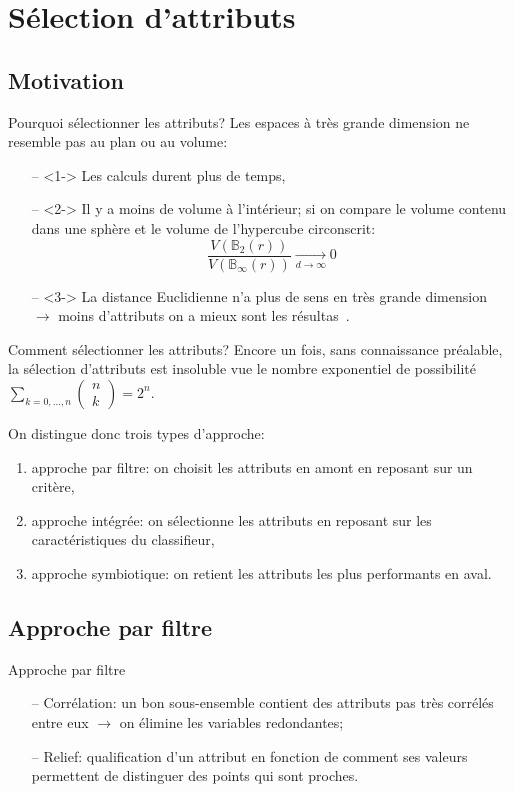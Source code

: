 \documentclass[9pt]{beamer}
\begin{document}
	\section[feature selection]{Sélection d'attributs}
	\subsection[motivation]{Motivation}
	\begin{frame}{Pourquoi sélectionner les attributs?}
		Les espaces à très grande dimension ne resemble pas au plan ou au volume:
		\begin{itemize}
			\item[--]<1-> Les calculs durent plus de temps,
			\item[--]<2-> Il y a moins de volume à l'intérieur; si on compare le volume contenu dans une sphère et le volume de l'hypercube circonscrit:
			$$\frac{V(\mathbb{B}_{2}(r))}{V(\mathbb{B}_{\infty}(r))}\xrightarrow[d \to \infty]{} 0$$
			\item[--]<3-> La distance Euclidienne n'a plus de sens en très grande dimension $\longrightarrow$ moins d'attributs on a mieux sont les résultas~\cite{Domingos:2012:FUT:2347736.2347755}.
		\end{itemize}
	\end{frame}

	\begin{frame}{Comment sélectionner les attributs?}
		Encore un fois, sans connaissance préalable, la sélection d'attributs est insoluble vue le nombre exponentiel de possibilité $\sum_{k=0,\dots,n} \begin{pmatrix}
		n\\
		k
		\end{pmatrix} = 2^n$.

		On distingue donc trois types d'approche:
		\begin{enumerate}
			\item<1-> approche par filtre: on choisit les attributs en amont en reposant sur un critère,
			\item<2-> approche intégrée: on sélectionne les attributs en reposant sur les caractéristiques du classifieur,
			\item<3-> approche symbiotique: on retient les attributs les plus performants en aval.
		\end{enumerate}
	\end{frame}

	\subsection[filter approach]{Approche par filtre}
	\begin{frame}{Approche par filtre}
		\begin{itemize}
			\item[--] Corrélation: un bon sous-ensemble contient des attributs pas très corrélés entre eux $\longrightarrow$ on élimine les variables redondantes;
			\item[--] Relief: qualification d'un attribut en fonction de comment ses valeurs permettent de distinguer des points qui sont proches.
		\end{itemize}
	\end{frame}
\end{document}

